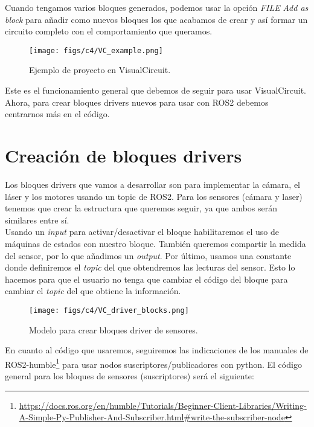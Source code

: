 Cuando tengamos varios bloques generados, podemos usar la opción \textit{FILE} \overrightarrow{ } \textit{Add as block} para añadir como nuevos bloques
los que acabamos de crear y así formar un circuito completo con el comportamiento que queramos.
\begin{figure} [H]
  \begin{center}
      \texttt{[image: figs/c4/VC\_example.png]}
  \end{center}
  \caption[Ejemplo de proyecto en VisualCircuit]{Ejemplo de proyecto en VisualCircuit.}
  \label{fig:VC_example}
\end{figure}

Este es el funcionamiento general que debemos de seguir para usar VisualCircuit. Ahora, para crear bloques drivers nuevos para usar con ROS2
debemos centrarnos más en el código.

\section{Creación de bloques drivers}
\label{sec:drivers_creacion}

Los bloques drivers que vamos a desarrollar son para implementar la cámara, el láser y los motores usando un topic de ROS2.
Para los sensores (cámara y laser) tenemos que crear la estructura que queremos seguir, ya que ambos serán similares entre sí.\\

Usando un \textit{input} para activar/desactivar el bloque habilitaremos el uso de máquinas de estados con nuestro bloque.
También queremos compartir la medida del sensor, por lo que añadimos un \textit{output}. Por último, usamos una constante donde definiremos
el \textit{topic} del que obtendremos las lecturas del sensor. Esto lo hacemos para que el usuario no tenga que cambiar el código del bloque para cambiar
el \textit{topic} del que obtiene la información.\\
\begin{figure} [H]
  \begin{center}
      \texttt{[image: figs/c4/VC\_driver\_blocks.png]}
  \end{center}
  \caption[Modelo bloque driver sensores]{Modelo para crear bloques driver de sensores.}
  \label{fig:VC_driver_model}
\end{figure}

En cuanto al código que usaremos, seguiremos las indicaciones de los manuales de
ROS2-humble\footnote{\url{https://docs.ros.org/en/humble/Tutorials/Beginner-Client-Libraries/Writing-A-Simple-Py-Publisher-And-Subscriber.html\#write-the-subscriber-node}}
para usar nodos suscriptores/publicadores con python. El código general para los bloques de sensores (suscriptores) será el siguiente:


